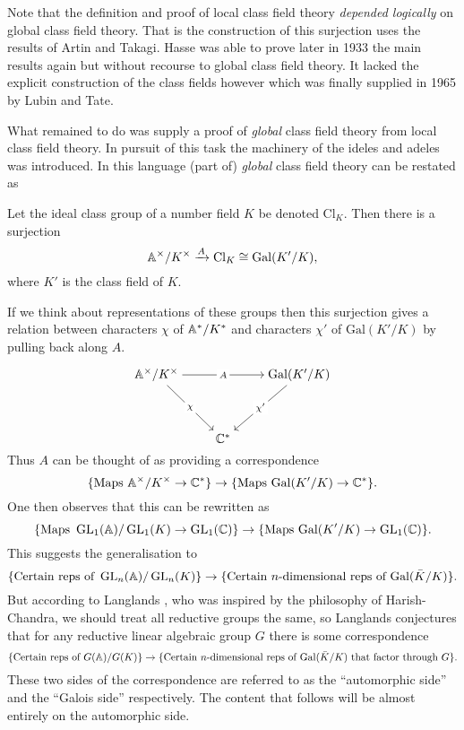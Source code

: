 Note that the definition and proof of local class field theory \textit{depended logically} on global class field theory. That is the construction of this surjection uses the results of Artin and Takagi. Hasse was able to prove later in 1933 the main results again but without recourse to global class field theory. It lacked the explicit construction of the class fields however which was finally supplied in 1965 by Lubin and Tate.

What remained to do was supply a proof of \textit{global} class field theory from local class field theory. In pursuit of this task the machinery of the ideles and adeles was introduced. In this language (part of) \textit{global} class field theory can be restated as 
\begin{Theorem}
	Let the ideal class group of a number field \(K\) be denoted \(\mathrm{Cl}_K\). Then there is a surjection
	\[ \A^\times/ K^\times \xrightarrow{A} \mathrm{Cl}_K \cong \mathrm{Gal}(K'/K),\]
	where \(K'\) is the class field of \(K\).
\end{Theorem}
If we think about representations of these groups then this surjection gives a relation between characters \(\chi\) of \(\A^*/K^*\) and characters \(\chi'\) of \(\mathrm{Gal}(K'/K)\) by pulling back along \(A\).

\[\begin{tikzcd}[cramped]
	{\A^\times/K^\times} && {\mathrm{Gal}(K'/K)} \\
	\\
	& {\C^*}
	\arrow["A"{description}, from=1-1, to=1-3]
	\arrow["\chi"{description}, from=1-1, to=3-2]
	\arrow["{\chi'}"{description}, from=1-3, to=3-2]
\end{tikzcd}\]
Thus \(A\) can be thought of as providing a correspondence
\[\{\text{Maps }\A^\times/K^\times\to \C^*\} \to\{ \text{Maps }\mathrm{Gal}(K'/K)\to \C^*\}. \]
One then observes that this can be rewritten as 
\[\{\text{Maps }\GL_1(\A)/\GL_1(K)\to \GL_1(\C)\} \to\{ \text{Maps }\mathrm{Gal}(K'/K)\to \GL_1(\C)\} .\]
This suggests the generalisation to 
\[\{\text{Certain reps of }\GL_n(\A)/\GL_n(K)\} \to\{ \text{Certain \(n\)-dimensional reps of  }\mathrm{Gal}(\bar{K}/K)\}   .\]
But according to Langlands \cite{langlandsRepresentationTheoryIts1989}, who was inspired by the philosophy of Harish-Chandra, we should treat all reductive groups the same, so Langlands conjectures that for any reductive linear algebraic group \(G\) there is some correspondence
\[\{\text{Certain reps of }G(\A)/G(K)\} \to\{ \text{Certain \(n\)-dimensional reps of }\mathrm{Gal}(\bar{K}/K) \text{ that factor through }G\}.\]
These two sides of the correspondence are referred to as the ``automorphic side'' and the ``Galois side'' respectively. The content that follows will be almost entirely on the automorphic side. 


